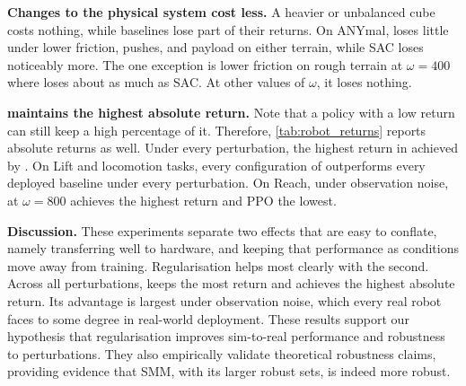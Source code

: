 \textbf{Changes to the physical system cost less.}
A heavier or unbalanced cube costs \ourMethod nothing, while baselines lose part of their returns.
On ANYmal, \ourMethod loses little under lower friction, pushes, and payload on either terrain, while SAC loses noticeably more.
The one exception is lower friction on rough terrain at $\omega=400$ where \ourMethod loses about as much as SAC. At other values of $\omega$, it loses nothing.

\textbf{\ourMethod maintains the highest absolute return.}
Note that a policy with a low return can still keep a high percentage of it. Therefore, \autoref{tab:robot_returns} reports absolute returns as well. 
Under every perturbation, the highest return in achieved by \ourMethod.
On Lift and locomotion tasks, every configuration of \ourMethod outperforms every deployed baseline under every perturbation.
On Reach, under observation noise, \ourMethod at $\omega=800$ achieves the highest return and PPO the lowest.

\textbf{Discussion.}
These experiments separate two effects that are easy to conflate, namely transferring well to hardware, and keeping that performance as conditions move away from training.
Regularisation helps most clearly with the second.
Across all perturbations, \ourMethod keeps the most return and achieves the highest absolute return.
Its advantage is largest under observation noise, which every real robot faces to some degree in real-world deployment. These results support our hypothesis that regularisation improves sim-to-real performance and robustness to perturbations. They also empirically validate theoretical robustness claims, providing evidence that SMM, with its larger robust sets, is indeed more robust.
